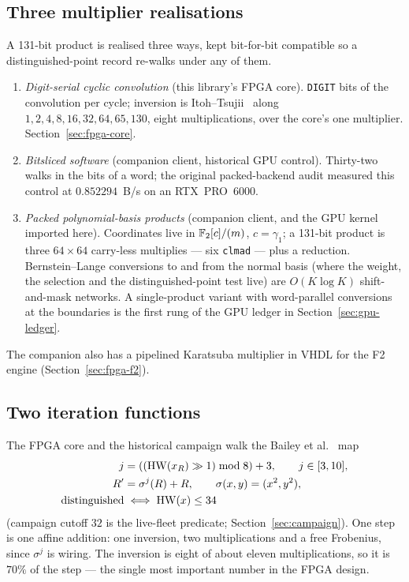 \subsection{Three multiplier realisations}

A 131-bit product is realised three ways, kept bit-for-bit compatible
so a distinguished-point record re-walks under any of them.

\begin{enumerate}[leftmargin=1.2em,itemsep=0.4em]
\item \emph{Digit-serial cyclic convolution} (this library's FPGA
  core). \texttt{DIGIT} bits of the convolution per cycle; inversion
  is Itoh--Tsujii~\cite{itoh1988} along $1,2,4,8,16,32,64,65,130$,
  eight multiplications, over the core's one multiplier.
  Section~\ref{sec:fpga-core}.
\item \emph{Bitsliced software} (companion client, historical GPU
  control). Thirty-two walks in the bits of a word; the original
  packed-backend audit measured this control at $0.852294$~B/s on an
  RTX~PRO~6000.
\item \emph{Packed polynomial-basis products} (companion client, and
  the GPU kernel imported here). Coordinates live in
  $\mathbb{F}_2[c]/(m)$, $c=\gamma_1$; a 131-bit product is three $64\times
  64$ carry-less multiplies --- six \texttt{clmad} --- plus a
  reduction. Bernstein--Lange conversions to and from the normal
  basis (where the weight, the selection and the distinguished-point
  test live) are $O(K\log K)$ shift-and-mask networks. A single-product
  variant with word-parallel conversions at the boundaries is the
  first rung of the GPU ledger in Section~\ref{sec:gpu-ledger}.
\end{enumerate}

The companion also has a pipelined Karatsuba multiplier in VHDL for
the F2 engine (Section~\ref{sec:fpga-f2}).

\subsection{Two iteration functions}

The FPGA core and the historical campaign walk the Bailey et
al.~\cite{bailey2009} map
\begin{align*}
  j &= ((\operatorname{HW}(x_R)\gg 1)\bmod 8)+3, \qquad j\in[3,10],\\
  R' &= \sigma^j(R)+R, \qquad \sigma(x,y)=(x^2,y^2),\\
  \text{distinguished} &\iff \operatorname{HW}(x)\le 34
\end{align*}
(campaign cutoff $32$ is the live-fleet predicate;
Section~\ref{sec:campaign}). One step is one affine addition: one
inversion, two multiplications and a free Frobenius, since $\sigma^j$
is wiring. The inversion is eight of about eleven multiplications, so
it is $70\%$ of the step --- the single most important number in the
FPGA design.


